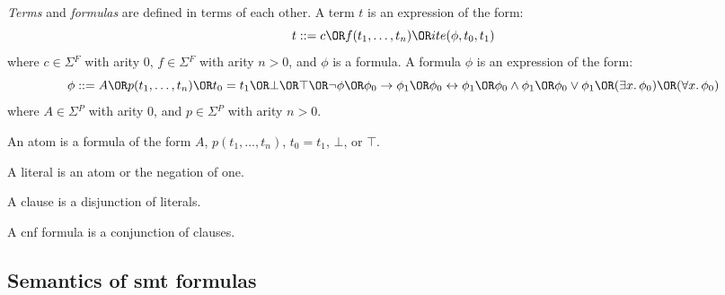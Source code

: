 \begin{definition}
  \textit{Terms} and \textit{formulas} are defined in terms of each other.
  A term $t$ is an expression of the form:
  \[t ::= c \OR f(t_1,\ldots,t_n) \OR ite(\phi{}, t_0, t_1)\]
  where $c \in \Sigma{}^F$ with arity 0, $f \in \Sigma{}^F$ with arity
  $n > 0$, and $\phi{}$ is a formula.
  A formula $\phi{}$ is an expression of the form:
  \[\phi{} ::= A
    \OR p(t_1,\ldots,t_n)
    \OR t_0 = t_1
    \OR \bot{}
    \OR \top{}
    \OR \neg{}\phi{}
    \OR \phi{}_0 \rightarrow{} \phi{}_1
    \OR \phi{}_0 \leftrightarrow{} \phi{}_1
    \OR \phi{}_0 \land{} \phi{}_1
    \OR \phi{}_0 \lor{} \phi{}_1
    \OR (\exists{}x\ldotp\phi{}_0)
    \OR (\forall{}x\ldotp\phi{}_0)
  \]
  where $A \in \Sigma{}^P$ with arity 0, and $p \in \Sigma{}^P$ with arity
  $n > 0$.
\end{definition}

\begin{definition}[Atom]
  An atom is a formula of the form $A$, $p(t_1,\ldots,t_n)$, $t_0 = t_1$,
  $\bot{}$, or $\top{}$.
\end{definition}

\begin{definition}[Literal]
  A literal is an atom or the negation of one.
\end{definition}

\begin{definition}[Clause]
  A clause is a disjunction of literals.
\end{definition}

\begin{definition}
  A \gls{cnf} formula is a conjunction of clauses.
\end{definition}

\subsection{Semantics of \gls{smt} formulas}
\label{sec:smt-syntax}

\begin{definition}[Model]
\end{definition}

\begin{definition}[Interpretation]
\end{definition}

\begin{definition}[Satisfiability]
\end{definition}

